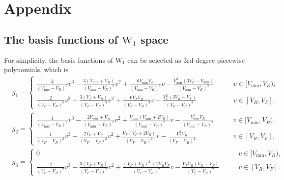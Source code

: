 \appendix


\section{Appendix}
\label{sec:app}
\subsection{The basis functions of $\mathrm{W}_1$ space}
\label{app:basis}

For simplicity, the basis functions of $\mathrm{W}_1$ can be selected as 3rd-degree piecewise polynomials, which is
 \begin{equation}
\begin{aligned}
    &\displaystyle g_1=\begin{cases}
        \displaystyle \frac{2}{(V_{\text{min}}-V_R)^3}v^3-\frac{3(V_{\text{min}}+V_R)}{(V_{\text{min}}-V_R)^3}v^2+\frac{6V_{\text{min}}V_R}{(V_{\text{min}}-V_R)^3}v-\frac{V_{\text{min}}^2(3V_R-V_{\text{min}})}{(V_{\text{min}}-V_R)^3} \qquad &v\in[V_{\text{min}},V_R),\\
        \displaystyle \frac{2}{(V_F-V_R)^3}v^3-\frac{3(V_F+V_R)}{(V_F-V_R)^3}v^2+\frac{6V_FV_R}{(V_F-V_R)^3}v-\frac{V_F^2(3V_R-V_F)}{(V_F-V_R)^3} &v\in[V_R,V_F],
    \end{cases}\\
    &\displaystyle g_2=\begin{cases}
        \displaystyle  \frac{1}{(V_{\text{min}}-V_R)^2}v^3-\frac{2V_{\text{min}}+V_R}{(V_{\text{min}}-V_R)^2}v^2+\frac{V_{\text{min}}(V_{\text{min}}+2V_R)}{(V_{\text{min}}-V_R)^2}v-\frac{V_{\text{min}}^2V_R}{(V_{\text{min}}-V_R)^2} \qquad &v\in[V_{\text{min}},V_R),\\
        \displaystyle  \frac{1}{(V_F-V_R)^2}v^3-\frac{2V_F+V_R}{(V_F-V_R)^2}v^2+\frac{V_F(V_F+2V_R)}{(V_F-V_R)^2}v-\frac{V_F^2V_R}{(V_F-V_R)^2} &v\in[V_R,V_F],
    \end{cases}\\
    &g_3=\begin{cases}
        0 \qquad &v\in [V_{\text{min}},V_R),\\
        \displaystyle  \frac{2}{(V_F-V_R)^2}v^3-\frac{3(V_F+V_R)}{(V_F-V_R)^2}v^2+\frac{(V_F+V_R)^2+2V_RV_F}{(V_F-V_R)^2}v-\frac{V_FV_R(V_R+V_F)}{(V_F-V_R)^2} \qquad &v\in[V_R,V_F].
    \end{cases}
\end{aligned}
\end{equation}